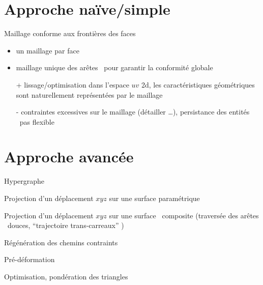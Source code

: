 \section{Approche naïve/simple}
Maillage conforme aux frontières des faces \brep\ \cite{andrieu2017}
\begin{itemize}
	\item un maillage par face \brep
	\item maillage unique des arêtes \brep\ pour garantir la conformité globale
	\item[+] lissage/optimisation dans l'espace $uv$ 2d, les caractéristiques géométriques sont naturellement représentées par le maillage
	\item[-] contraintes excessives sur le maillage (détailler \ldots), persistance des entités \brep\  pas flexible
\end{itemize}

\section{Approche avancée}
Hypergraphe \cite{foucault2008}\par
Projection d'un déplacement $xyz$ sur une surface paramétrique\par
Projection d'un déplacement $xyz$ sur une surface \brep\ composite (traversée des arêtes \brep\ douces, ``trajectoire trans-carreaux'' \cite[Section~5.5]{foucault2008})\par
Régénération des chemins contraints\par
Pré-déformation\par
Optimisation, pondération des triangles



